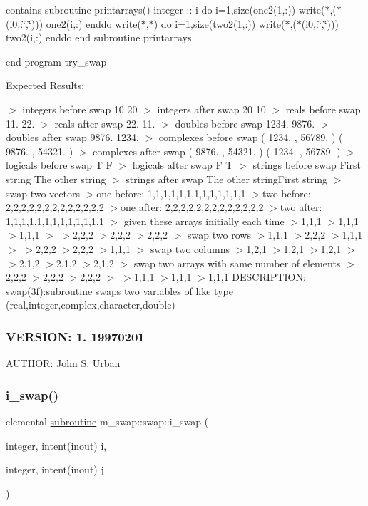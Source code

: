 contains subroutine printarrays() integer \+:\+: i do i=1,size(one2(1,\+:)) write($\ast$,\textquotesingle{}($\ast$(i0,\+:\char`\"{},\char`\"{}))\textquotesingle{}) one2(i,\+:) enddo write($\ast$,$\ast$) do i=1,size(two2(1,\+:)) write($\ast$,\textquotesingle{}($\ast$(i0,\+:\char`\"{},\char`\"{}))\textquotesingle{}) two2(i,\+:) enddo end subroutine printarrays

end program try\+\_\+swap

Expected Results\+:

$>$ integers before swap 10 20 $>$ integers after swap 20 10 $>$ reals before swap 11. 22. $>$ reals after swap 22. 11. $>$ doubles before swap 1234. 9876. $>$ doubles after swap 9876. 1234. $>$ complexes before swap ( 1234. , 56789. ) ( 9876. , 54321. ) $>$ complexes after swap ( 9876. , 54321. ) ( 1234. , 56789. ) $>$ logicals before swap T F $>$ logicals after swap F T $>$ strings before swap First string The other string $>$ strings after swap The other string\+First string $>$ swap two vectors $>$one before\+: 1,1,1,1,1,1,1,1,1,1,1,1,1 $>$two before\+: 2,2,2,2,2,2,2,2,2,2,2,2,2 $>$one after\+: 2,2,2,2,2,2,2,2,2,2,2,2,2 $>$two after\+: 1,1,1,1,1,1,1,1,1,1,1,1,1 $>$ given these arrays initially each time $>$1,1,1 $>$1,1,1 $>$1,1,1 $>$ $>$2,2,2 $>$2,2,2 $>$2,2,2 $>$ swap two rows $>$1,1,1 $>$2,2,2 $>$1,1,1 $>$ $>$2,2,2 $>$2,2,2 $>$1,1,1 $>$ swap two columns $>$1,2,1 $>$1,2,1 $>$1,2,1 $>$ $>$2,1,2 $>$2,1,2 $>$2,1,2 $>$ swap two arrays with same number of elements $>$2,2,2 $>$2,2,2 $>$2,2,2 $>$ $>$1,1,1 $>$1,1,1 $>$1,1,1 D\+E\+S\+C\+R\+I\+P\+T\+I\+ON\+: swap(3f)\+:subroutine swaps two variables of like type (real,integer,complex,character,double) \subsubsection*{V\+E\+R\+S\+I\+ON\+: 1. 19970201}

A\+U\+T\+H\+OR\+: John S. Urban \mbox{\label{interfacem__swap_1_1swap_a699e0cac27eee46b38b357d8116a5c61}} 
\subsubsection{\texorpdfstring{i\+\_\+swap()}{i\_swap()}}
{\footnotesize\ttfamily elemental \hyperlink{M__stopwatch_83_8txt_acfbcff50169d691ff02d4a123ed70482}{subroutine} m\+\_\+swap\+::swap\+::i\+\_\+swap (\begin{DoxyParamCaption}\item[{integer, intent(inout)}]{i,  }\item[{integer, intent(inout)}]{j }\end{DoxyParamCaption})\hspace{0.3cm}{\ttfamily [private]}}

